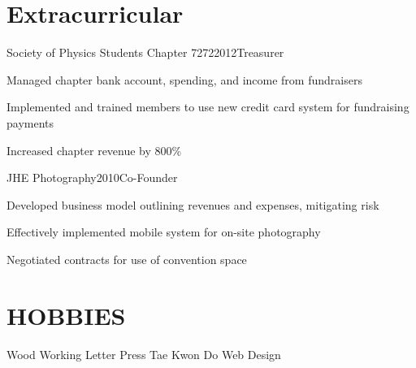 \documentclass[12pt,a4paper]{resume}
\begin{document}
\section{Extracurricular}
\begin{work}{Society of Physics Students Chapter 7272}{2012}{Treasurer}
\item{Managed chapter bank account, spending, and income from fundraisers}
\item{Implemented and trained members to use new credit card system for fundraising payments}
\item{Increased chapter revenue by 800\%}
\end{work}

\begin{work}{JHE Photography}{2010}{Co-Founder}
\item{Developed business model outlining revenues and expenses, mitigating risk}
\item{Effectively implemented mobile system for on-site photography}
\item{Negotiated contracts for use of convention space}
\end{work}


\section{HOBBIES}
Wood Working  \hfill{} Letter Press \hfill{} Tae Kwon Do \hfill Web Design
\end{document}
